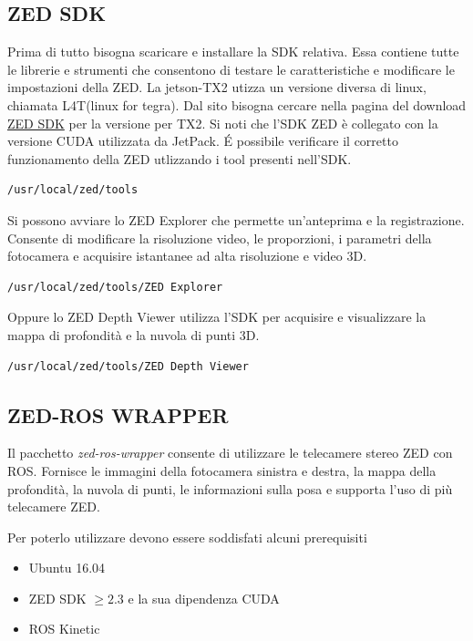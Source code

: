 \documentclass[a4paper]{article}
\begin{document}
\subsection{ZED SDK}
Prima di tutto bisogna scaricare e installare la SDK relativa. Essa contiene tutte le librerie e strumenti che  consentono di testare le caratteristiche e modificare le impostazioni della ZED.
La jetson-TX2 utizza un versione diversa di linux, chiamata L4T(linux for tegra). Dal sito bisogna cercare nella pagina del download 
 \href{https://www.stereolabs.com/developers/release/#sdkdownloads_anchor}{ZED SDK} per la versione per TX2. 
Si noti che l'SDK ZED è collegato con la versione CUDA utilizzata da JetPack.
\'E possibile verificare il corretto funzionamento della ZED utlizzando i tool presenti nell'SDK.
\begin{verbatim}
/usr/local/zed/tools
\end{verbatim}
Si possono avviare lo ZED Explorer che permette un'anteprima e la registrazione. Consente di modificare la risoluzione video, le proporzioni, i parametri della fotocamera e acquisire istantanee ad alta risoluzione e video 3D.
\begin{verbatim}
/usr/local/zed/tools/ZED Explorer
\end{verbatim}
Oppure lo ZED Depth Viewer utilizza l'SDK per acquisire e visualizzare la mappa di profondità e la nuvola di punti 3D.
\begin{verbatim}
/usr/local/zed/tools/ZED Depth Viewer
\end{verbatim}


\subsection{ZED-ROS WRAPPER}

Il pacchetto \textit{zed-ros-wrapper} consente di utilizzare le telecamere stereo ZED con ROS. Fornisce le immagini della fotocamera sinistra e destra, la mappa della profondità, la nuvola di punti, le informazioni sulla posa e supporta l'uso di più telecamere ZED.


Per  poterlo utilizzare devono essere soddisfati alcuni prerequisiti

\begin{itemize}
\item Ubuntu 16.04
\item ZED SDK $\ge 2.3 $   e la sua dipendenza CUDA
\item ROS Kinetic
\end{itemize}
\end{document}
